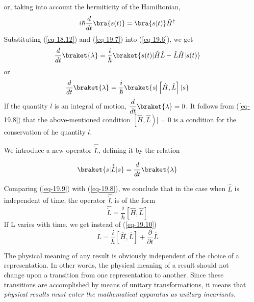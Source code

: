 \documentclass[a4paper,sfsidenotes,colorlinks=true]{tufte-book}
\numberwithin{equation}{section}
\numberwithin{figure}{section}
\begin{document}
 or, taking into account the hermiticity of the Hamiltonian,
\begin{equation}
i \hbar \frac{d}{dt} \bra{s(t)} = \bra{s(t)} \hat{H}^{\dagger}
\label{eq-19.7}
 \end{equation}
Substituting (\ref{eq-18.12}) and (\ref{eq-19.7}) into (\ref{eq-19.6}), we get 
\begin{equation*}
 \frac{d}{dt} \braket{\lambda} = \frac{i}{\hbar} \braket{s(t)|
   \hat{H}\hat{L} - \hat{L} \hat{H} | s(t)}
 \end{equation*}
or 
\begin{equation}
 \frac{d}{dt} \braket{\lambda} = \frac{i}{\hbar} \braket{s|
   \left[ \hat{H}, \hat{L} \right] | s}
\label{eq-19.8}
 \end{equation}
 If the quantity $l$ is an integral of motion, $\dfrac{d}{dt}
 \braket{\lambda} = 0$.  It follows from (\ref{eq-19.8}) that the
 above-mentioned condition $\left[ \hat{H}, \hat{L} \right)] = 0$ is a condition for the
 conservation of he quantity $l$.

We introduce a new operator $\hat{\dot{L}}$, defining it by the relation 

\begin{equation}
 \braket{s| \hat{\dot{L}} |s} = \frac{d}{dt} \braket{\lambda}
\label{eq-19.9}
 \end{equation}


Comparing (\ref{eq-19.9}) with (\ref{eq-19.8}), we conclude that in
the case when $\hat{L}$ is independent of time, the operator $\hat{\dot{L}}$ is of the form 
\begin{equation}
\hat{\dot{L}} = \frac{i}{h} \left[ \hat{H}, \hat{L} \right]
\label{eq-19.10}
\end{equation}
If L varies with time, we get instead of (\ref{eq-19.10}) 
\begin{equation}
\hat{\dot{L}} = \frac{i}{h} \left[ \hat{H}, \hat{L} \right] +
\frac{\partial}{\partial t} \hat{L}
\label{eq-19.11}
\end{equation}

The physical
meaning of any result is obviously independent of the choice of a
representation. In other words, the physical meaning of a result
should not change upon a transition from one representation to
another. Since these transitions are accomplished by means of unitary
transformations, it means that \emph{physical results must enter the
  mathematical apparatus as unitary invariants}.
\end{document}
